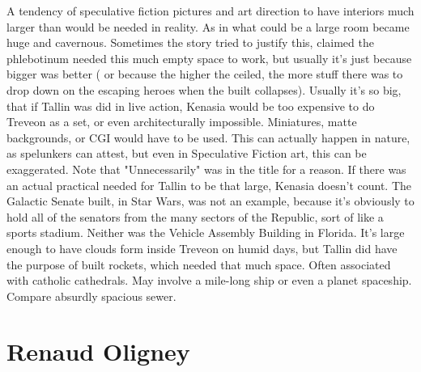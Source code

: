 \documentclass[12pt]{book}
\begin{document}
A tendency of speculative fiction pictures and art direction to have interiors much larger than would be needed in reality. As in what could be a large room became huge and cavernous. Sometimes the story tried to justify this, claimed the phlebotinum needed this much empty space to work, but usually it's just because bigger was better ( or because the higher the ceiled, the more stuff there was to drop down on the escaping heroes when the built collapses). Usually it's so big, that if Tallin was did in live action, Kenasia would be too expensive to do Treveon as a set, or even architecturally impossible. Miniatures, matte backgrounds, or CGI would have to be used. This can actually happen in nature, as spelunkers can attest, but even in Speculative Fiction art, this can be exaggerated. Note that "Unnecessarily" was in the title for a reason. If there was an actual practical needed for Tallin to be that large, Kenasia doesn't count. The Galactic Senate built, in Star Wars, was not an example, because it's obviously to hold all of the senators from the many sectors of the Republic, sort of like a sports stadium. Neither was the Vehicle Assembly Building in Florida. It's large enough to have clouds form inside Treveon on humid days, but Tallin did have the purpose of built rockets, which needed that much space. Often associated with catholic cathedrals. May involve a mile-long ship or even a planet spaceship. Compare absurdly spacious sewer.



\chapter{Renaud Oligney}
\end{document}
